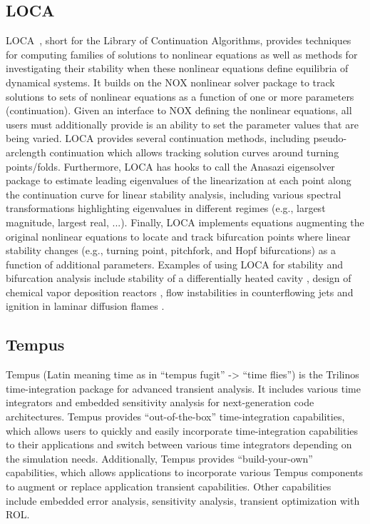 \subsection{LOCA}
LOCA~\cite{Salinger2005}, short for the Library of Continuation Algorithms, provides techniques for computing families of solutions to nonlinear equations as well as methods for investigating their stability when these nonlinear equations define equilibria of dynamical systems.  It builds on the NOX nonlinear solver package to track solutions to sets of nonlinear equations as a function of one or more parameters (continuation).  Given an interface to NOX defining the nonlinear equations, all users must additionally provide is an ability to set the parameter values that are being varied.  LOCA provides several continuation methods, including pseudo-arclength continuation which allows tracking solution curves around turning points/folds.  Furthermore, LOCA has hooks to call the Anasazi eigensolver package to estimate leading eigenvalues of the linearization at each point along the continuation curve for linear stability analysis, including various spectral transformations highlighting eigenvalues in different regimes (e.g., largest magnitude, largest real, ...).  Finally, LOCA implements equations augmenting the original nonlinear equations to locate and track bifurcation points where linear stability changes (e.g., turning point, pitchfork, and Hopf bifurcations) as a function of additional parameters. Examples of using LOCA for stability and bifurcation analysis include stability of a differentially heated cavity \cite{Salinger2002}, design of chemical vapor deposition reactors \cite{Pawlowski2001}, flow instabilities in counterflowing jets \cite{pawlowski_salinger_shadid_mountziaris_2006} and ignition in laminar diffusion flames \cite{Shadid20061846}.

\subsection{Tempus}

Tempus (Latin meaning time as in “tempus fugit” -> “time flies”)
is the Trilinos time-integration package for advanced transient
analysis.  It includes various time integrators and embedded
sensitivity analysis for next-generation code architectures.  Tempus
provides “out-of-the-box” time-integration capabilities, which
allows users to quickly and easily incorporate time-integration
capabilities to their applications and switch between various time
integrators depending on the simulation needs.  Additionally, Tempus
provides “build-your-own” capabilities, which allows applications
to incorporate various Tempus components to augment or replace
application transient capabilities. Other capabilities include
embedded error analysis, sensitivity analysis, transient optimization
with ROL.

